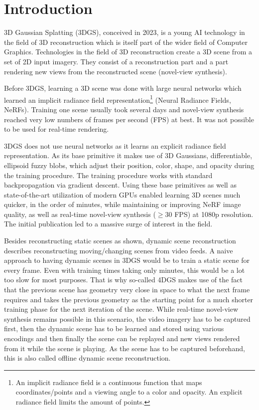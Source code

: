 \section{Introduction}


3D Gaussian Splatting (3DGS), conceived in 2023, is a young AI technology in the field of 3D reconstruction which is itself part of the wider field of Computer Graphics. Technologies in the field of 3D reconstruction create a 3D scene from a set of 2D input imagery.
They consist of a reconstruction part and a part rendering new views from the reconstructed scene (novel-view synthesis).

Before 3DGS, learning a 3D scene was done with large neural networks which learned an implicit radiance field representation\footnote{An implicit radiance field is a continuous function that maps coordinates/points and a viewing angle to a color and opacity. An explicit radiance field limits the amount of points.} (Neural Radiance Fields, NeRFs). 
Training one scene usually took several days and novel-view synthesis reached very low numbers of frames per second (FPS) at best. It was not possible to be used for real-time rendering.

3DGS does not use neural networks as it learns an explicit radiance field representation. As its base primitive it makes use of 3D Gaussians, differentiable, ellipsoid fuzzy blobs, which adjust their position, color, shape, and opacity during the training procedure.
The training procedure works with standard backpropagation via gradient descent. Using these base primitives as well as state-of-the-art utilization of modern GPUs enabled learning 3D scenes much quicker, in the order of minutes, while maintaining or improving NeRF image quality, as well as real-time novel-view synthesis ($\ge30$ FPS) at 1080p resolution. The initial publication led to a massive surge of interest in the field.

Besides reconstructing static scenes as shown, dynamic scene reconstruction describes reconstructing moving/changing scenes from video feeds. A naive approach to having dynamic scenes in 3DGS would be to train a static scene for every frame.
Even with training times taking only minutes, this would be a lot too slow for most purposes. That is why so-called 4DGS makes use of the fact that the previous scene has geometry very close in space to what the next frame requires and takes the previous geometry as the starting point for a much shorter training phase for the next iteration of the scene.
While real-time novel-view synthesis remains possible in this scenario, the video imagery has to be captured first, then the dynamic scene has to be learned and stored using various encodings and then finally the scene can be replayed and new views rendered from it while the scene is playing.
As the scene has to be captured beforehand, this is also called offline dynamic scene reconstruction.


